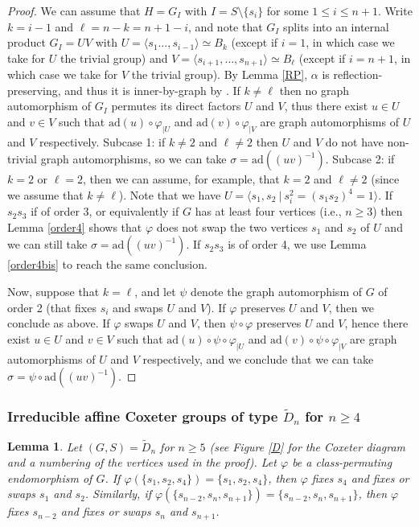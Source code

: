 \documentclass[a4paper, 11pt]{amsart}
\newtheorem{lemme}[te]{Lemma}
\theoremstyle{definition}
\theoremstyle{remark}
\renewcommand{\leq}{\leqslant}
\renewcommand{\geq}{\geqslant}
\begin{document}
\begin{proof}We can assume that $H=G_I$ with $I= S\setminus \lbrace s_i\rbrace$ for some $1\leq i\leq n+1$. Write $k=i-1$ and $\ell=n-k=n+1-i$, and note that $G_I$ splits into an internal product $G_I=UV$ with $U=\langle s_1\ldots,s_{i-1}\rangle \simeq B_{k}$ (except if $i=1$, in which case we take for $U$ the trivial group) and $V=\langle s_{i+1},\ldots,s_{n+1}\rangle\simeq B_{\ell}$ (except if $i=n+1$, in which case we take for $V$ the trivial group). By Lemma \ref{RP}, $\alpha$ is reflection-preserving, and thus it is inner-by-graph by \cite{franz}. If $k\neq \ell$ then no graph automorphism of $G_I$ permutes its direct factors $U$ and $V$, thus there exist $u\in U$ and $v\in V$ such that $\mathrm{ad}(u)\circ \varphi_{\vert U}$ and $\mathrm{ad}(v)\circ \varphi_{\vert V}$ are graph automorphisms of $U$ and $V$ respectively. Subcase 1: if $k\neq 2$ and $\ell\neq 2$ then $U$ and $V$ do not have non-trivial graph automorphisms, so we can take $\sigma=\mathrm{ad}((uv)^{-1})$. Subcase 2: if $k=2$ or $\ell=2$, then we can assume, for example, that $k=2$ and $\ell\neq 2$ (since we assume that $k\neq \ell$). Note that we have $U=\langle s_1,s_2 \ \vert \ s_i^2=(s_1s_2)^4=1\rangle$. If $s_2s_3$ if of order 3, or equivalently if $G$ has at least four vertices (i.e., $n\geq 3$) then Lemma \ref{order4} shows that $\varphi$ does not swap the two vertices $s_1$ and $s_2$ of $U$ and we can still take $\sigma=\mathrm{ad}((uv)^{-1})$. If $s_2s_3$ is of order 4, we use Lemma \ref{order4bis} to reach the same conclusion.

\smallskip \noindent Now, suppose that $k=\ell$, and let $\psi$ denote the graph automorphism of $G$ of order 2 (that fixes $s_i$ and swaps $U$ and $V$). If $\varphi$ preserves $U$ and $V$, then we conclude as above. If $\varphi$ swaps $U$ and $V$, then $\psi \circ \varphi$ preserves $U$ and $V$, hence there exist $u\in U$ and $v\in V$ such that $\mathrm{ad}(u)\circ \psi\circ \varphi_{\vert U}$ and $\mathrm{ad}(v)\circ \psi \circ \varphi_{\vert V}$ are graph automorphisms of $U$ and $V$ respectively, and we conclude that we can take $\sigma=\psi \circ \mathrm{ad}((uv)^{-1})$.\end{proof}

\subsubsection{Irreducible affine Coxeter groups of type $\tilde{D}_n$ for $n\geq 4$} 

\begin{lemme}\label{B or D 2}
Let $(G,S)=\tilde{D}_n$ for $n\geq 5$ (see Figure \ref{D} for the Coxeter diagram and a numbering of the vertices used in the proof). Let $\varphi$ be a class-permuting endomorphism of $G$. If $\varphi(\lbrace s_1,s_2,s_4\rbrace)=\lbrace s_1,s_2,s_4\rbrace$, then $\varphi$ fixes $s_4$ and fixes or swaps $s_1$ and $s_2$. Similarly, if $\varphi(\lbrace s_{n-2},s_n,s_{n+1}\rbrace)=\lbrace s_{n-2},s_n,s_{n+1}\rbrace$, then $\varphi$ fixes $s_{n-2}$ and fixes or swaps $s_n$ and $s_{n+1}$.
\end{lemme}
\end{document}
